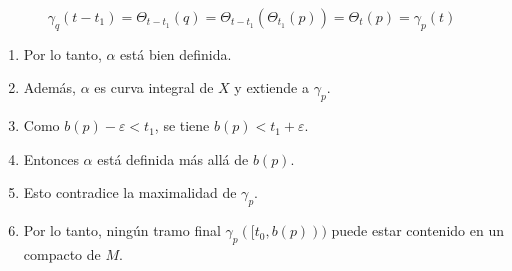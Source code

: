 \begin{bookproof}{}
\begin{enumerate}[start=26]
\end{enumerate}
\[
\gamma_q(t-t_1)=\Theta_{t-t_1}(q)=\Theta_{t-t_1}(\Theta_{t_1}(p))=\Theta_t(p)=\gamma_p(t)
\]
\begin{enumerate}[start=28]
\item Por lo tanto, $\alpha$ está bien definida.
\item Además, $\alpha$ es curva integral de $X$ y extiende a $\gamma_p$.
\item Como $b(p)-\varepsilon<t_1$, se tiene $b(p)<t_1+\varepsilon$.
\item Entonces $\alpha$ está definida más allá de $b(p)$.
\item Esto contradice la maximalidad de $\gamma_p$.
\item Por lo tanto, ningún tramo final $\gamma_p([t_0,b(p)))$ puede estar contenido en un compacto de $M$.
\end{enumerate}
\bookqed
\end{bookproof}
\label{blk:f386fd}
